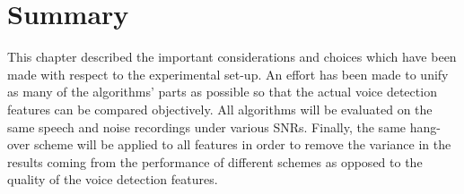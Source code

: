 \section{Summary}

This chapter described the important considerations and choices which have been made with respect to the experimental set-up. An effort has been made to unify as many of the algorithms' parts as possible so that the actual voice detection features can be compared objectively. All algorithms will be evaluated on the same speech and noise recordings under various SNRs. Finally, the same hang-over scheme will be applied to all features in order to remove the variance in the results coming from the performance of different schemes as opposed to the quality of the voice detection features.